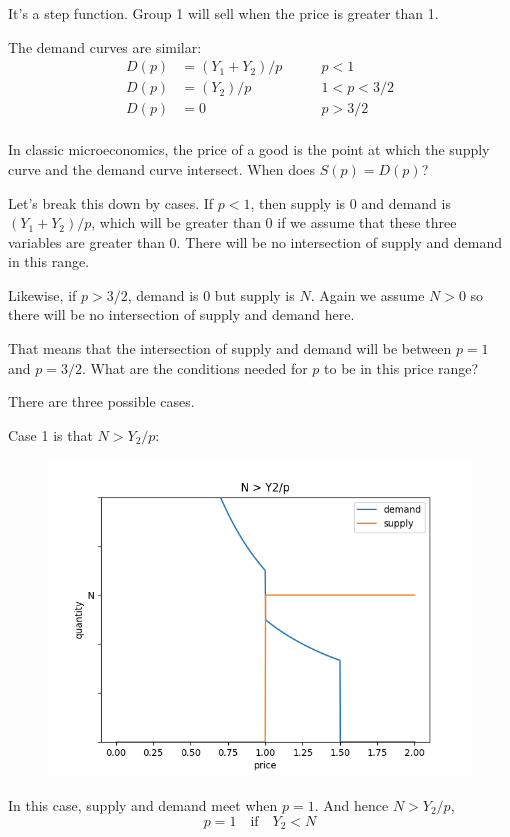 \documentclass[11pt]{article}
\begin{document}
It's a step function. Group 1 will sell when the price is greater than 1.

The demand curves are similar:
\begin{align*}
D(p) &= (Y_1 + Y_2)/p & \qquad p < 1\\
D(p) &= (Y_2)/p & \qquad 1 < p < 3/2\\
D(p) &= 0 & \qquad p > 3/2\\
\end{align*}

In classic microeconomics, the price of a good is the point at which the supply curve and the demand curve intersect. When does $S(p)=D(p)$?

Let's break this down by cases. If $p < 1$, then supply is 0 and demand is $(Y_1 + Y_2)/p$, which will be greater than 0 if we assume that these three variables are greater than 0. There will be no intersection of supply and demand in this range.

Likewise, if $p > 3/2$, demand is 0 but supply is $N$. Again we assume $N>0$ so there will be no intersection of supply and demand here. 

That means that the intersection of supply and demand will be between $p=1$ and $p=3/2$. What are the conditions needed for $p$ to be in this price range?

There are three possible cases. 

Case 1 is that $N > Y_2/p$:

\begin{figure}[h]
    \centering
    \includegraphics*[width=4.5in]{equilibrium1.png}
    \label{fig:equ1}
\end{figure}
\FloatBarrier


In this case, supply and demand meet when $p=1$. And hence $N > Y_2/p$,
\begin{equation}
    p=1 \quad \text{if} \quad Y_2 < N
\end{equation}
\end{document}
